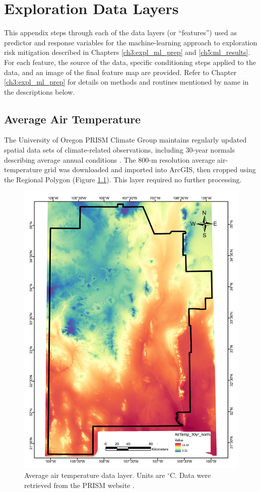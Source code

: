 \chapter{Exploration Data Layers}\label{app:A_data_layers}

This appendix steps through each of the data layers (or ``features'') used as predictor and response variables for the machine-learning approach to exploration risk mitigation described in Chapters \ref{ch3:expl_ml_prep} and \ref{ch5:ml_results}. For each feature, the source of the data, specific conditioning steps applied to the data, and an image of the final feature map are provided. Refer to Chapter \ref{ch3:expl_ml_prep} for details on methods and routines mentioned by name in the descriptions below.

\section{Average Air Temperature}\label{app:dl_air_temp}

The University of Oregon PRISM Climate Group maintains regularly updated spatial data sets of climate-related observations, including 30-year normals describing average annual conditions \citep{daly_physiographically_2008, prism_prism_2021}. The 800-m resolution average air-temperature grid was downloaded and imported into ArcGIS, then cropped using the Regional Polygon (Figure \ref{fig:feat_airtemp}). This layer required no further processing.

\begin{figure}[H]
\centering
\includegraphics[width=0.75\linewidth]{templates/images/Figure-AvgAirTemp.pdf}
\caption[Average air-temperature data layer]{Average air temperature data layer. Units are $^\circ$C. Data were retrieved from the PRISM website \protect\citep{prism_prism_2021}.}
\label{fig:feat_airtemp}
\end{figure}

